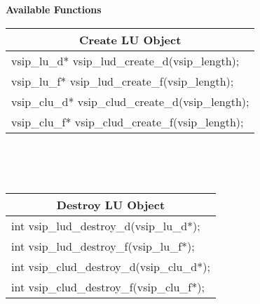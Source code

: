 \\\cvsiplh 
\\ \hspace*{.8cm} \vspace*{.1cm} \textbf{Available Functions }
%
\\ \hspace*{1.cm} {
\ttfamily\vspace{.3cm}
\begin{tabular}[H]{|l|}
\multicolumn{1}{c}{\rmfamily \bfseries Create LU Object\vspace{.1cm}}\\ \hline
vsip\_lu\_d* vsip\_lud\_create\_d(vsip\_length);\\
vsip\_lu\_f* vsip\_lud\_create\_f(vsip\_length);\\
vsip\_clu\_d* vsip\_clud\_create\_d(vsip\_length);\\
vsip\_clu\_f* vsip\_clud\_create\_f(vsip\_length);\\
\hline\end{tabular}\\}
%
\\ \hspace*{1.cm} {
\ttfamily\vspace{.3cm}
\begin{tabular}[H]{|l|}
\multicolumn{1}{c}{\rmfamily \bfseries Destroy LU Object\vspace{.1cm}}\\ \hline
int vsip\_lud\_destroy\_d(vsip\_lu\_d*);\\
int vsip\_lud\_destroy\_f(vsip\_lu\_f*);\\
int vsip\_clud\_destroy\_d(vsip\_clu\_d*);\\
int vsip\_clud\_destroy\_f(vsip\_clu\_f*);\\
\hline\end{tabular}\\}
%
